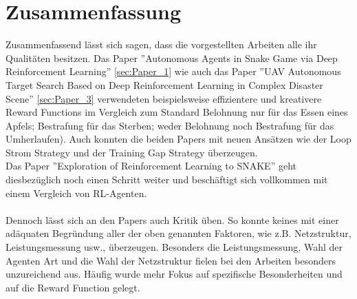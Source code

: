 \section{Zusammenfassung}
Zusammenfassend lässt sich sagen, dass die vorgestellten Arbeiten alle ihr Qualitäten besitzen. Das Paper ''Autonomous Agents in Snake Game via Deep Reinforcement Learning'' \ref{sec:Paper_1} wie auch das Paper ''UAV Autonomous Target Search Based on Deep Reinforcement Learning in Complex Disaster Scene'' \ref{sec:Paper_3} verwendeten beispielsweise effizientere und kreativere Reward Functions im Vergleich zum Standard Belohnung nur für das Essen eines Apfels; Bestrafung für das Sterben; weder Belohnung noch Bestrafung für das Umherlaufen). Auch konnten die beiden Papers mit neuen Ansätzen wie der Loop Strom Strategy und der Training Gap Strategy überzeugen.\\
Das Paper ''Exploration of Reinforcement Learning to SNAKE'' geht diesbezüglich noch einen Schritt weiter und beschäftigt sich vollkommen mit einem Vergleich von RL-Agenten.\\
\\ Dennoch lässt sich an den Papers auch Kritik üben. So konnte keines mit einer adäquaten Begründung aller der oben genannten Faktoren, wie z.B. Netzstruktur, Leistungsmessung usw., überzeugen. Besonders die Leistungsmessung, Wahl der Agenten Art und die Wahl der Netzstruktur fielen bei den Arbeiten besonders unzureichend aus. Häufig wurde mehr Fokus auf spezifische Besonderheiten und auf die Reward Function gelegt.
